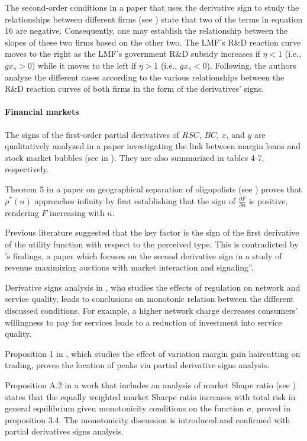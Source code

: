 \documentclass[11pt]{book}
\begin{document}
The second-order conditions in a paper that uses the derivative sign to study the relationships between different firms (see \cite{ho2021government}) state that
two of the terms in equation 16 are negative. Consequently, one may
establish the relationship between the slopes of these two firms based
on the other two. The LMF's R\&D reaction curve moves to the right
as the LMF's government R\&D subsidy increases if $\eta<1$ (i.e.,
$gx_{s}>0$) while it moves to the left if $\eta>1$ (i.e., $gx_{s}<0$).
Following, the authors analyze the different cases according to the
various relationships between the R\&D reaction curves of both firms
in the form of the derivatives' signs.


\paragraph{Financial markets}

The signs of the first-order partial derivatives of $RSC$, $BC$,
$x$, and $y$ are qualitatively analyzed in a paper investigating the link between margin loans and stock market bubbles (see in \cite{ricke2004link}). They are also summarized in tables 4-7, respectively.

Theorem 5 in a paper on geographical separation of oligopolists (see \cite{madden2006geographical}) proves that $\rho^{*}\left(n\right)$
approaches infinity by first establishing that the sign of $\frac{\partial F}{\partial n}$
is positive, rendering $F$ increasing with $n$.

Previous literature suggested that the key factor is the sign of the
first derivative of the utility function with respect to the perceived
type. This is contradicted by \cite{molnar2008revenue}'s findings,
a paper which focuses on the second derivative sign in a study of revenue maximizing auctions with market interaction
and signaling”.

Derivative signs analysis in \cite{haucap2012regulation}, who studies the effects of regulation on network and service quality, leads to
conclusions on monotonic relation between the different discussed
conditions. For example, a higher network charge decreases consumers'
willingness to pay for services leads to a reduction of investment
into service quality.

Proposition 1 in \cite{raykov2016share}, which studies the effect
of variation margin gain haircutting on trading, proves the location
of peaks via partial derivative signs analysis.

Proposition A.2 in a work that includes an analysis of market Shape ratio (see \cite{eisfeldt2017complex}) states that the equally
weighted market Sharpe ratio increases with total risk in general
equilibrium given monotonicity conditions on the function $\sigma$,
proved in proposition 3.4. The monotonicity discussion is introduced
and confirmed with partial derivatives signs analysis.
\end{document}
